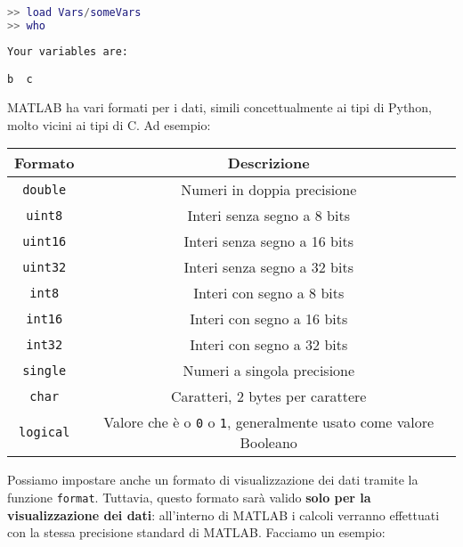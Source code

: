 \begin{terminal}
    \begin{lstlisting}[language=MATLAB, style=notexterm]
>> load Vars/someVars
>> who\end{lstlisting}
    \tcblower
    \begin{lstlisting}[style=notexterm, language = tex]
Your variables are:

b  c  \end{lstlisting}
\end{terminal}

MATLAB ha vari formati per i dati, simili concettualmente ai tipi di Python, molto vicini ai tipi di C. Ad esempio:

\begin{center}
    \begin{tabular}{|c|c|}
        \hline
        \textbf{Formato} & \textbf{Descrizione} \\
        \hline\hline
        \texttt{double} & Numeri in doppia precisione \\
        \hline
        \texttt{uint8} & Interi senza segno a 8 bits \\
        \hline
        \texttt{uint16} & Interi senza segno a 16 bits \\
        \hline
        \texttt{uint32} & Interi senza segno a 32 bits \\
        \hline
        \texttt{int8} & Interi con segno a 8 bits \\
        \hline
        \texttt{int16} & Interi con segno a 16 bits \\
        \hline
        \texttt{int32} & Interi con segno a 32 bits \\
        \hline
        \texttt{single} & Numeri a singola precisione \\
        \hline
        \texttt{char} & Caratteri, 2 bytes per carattere \\
        \hline
        \texttt{logical} & Valore che è o \texttt{0} o \texttt{1}, generalmente usato come valore Booleano \\
        \hline
    \end{tabular}
\end{center}

Possiamo impostare anche un formato di visualizzazione dei dati tramite la funzione \texttt{format}. Tuttavia, questo formato sarà valido \textbf{solo per la visualizzazione dei dati}: all'interno di MATLAB i calcoli verranno effettuati con la stessa precisione standard di MATLAB. Facciamo un esempio:

